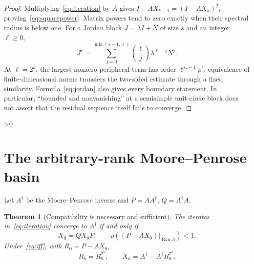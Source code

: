 \documentclass[9pt]{extarticle}
\newtheorem{theorem}{Theorem}
\newcommand{\ran}{\operatorname{Ran}}
\begin{document}
\begin{proof}
Multiplying~\eqref{eq:iteration} by $A$ gives
$I-AX_{k+1}=(I-AX_k)^2$, proving~\eqref{eq:squarepower}.  Matrix powers
tend to zero exactly when their spectral radius is below one.
For a Jordan block $J=\lambda I+N$ of size $s$ and an integer $\ell\geq0$,
\begin{equation}\label{eq:jordan}
 J^\ell=\sum_{j=0}^{\min(s-1,\ell)}
 \binom{\ell}{j}\lambda^{\ell-j}N^j.
\end{equation}
At $\ell=2^k$, the largest nonzero peripheral term has order
$\ell^{s_*-1}\rho^\ell$; equivalence of finite-dimensional norms transfers the
two-sided estimate through a fixed similarity.  Formula~\eqref{eq:jordan}
also gives every boundary statement.  In particular, ``bounded and
nonvanishing'' at a semisimple unit-circle block does not assert that the
residual sequence itself fails to converge.
\end{proof}

\ifnum\CRevisionRound>0
\section{The arbitrary-rank Moore--Penrose basin}
Let $A^\dagger$ be the Moore--Penrose inverse and
$P=AA^\dagger$, $Q=A^\dagger A$.

\begin{theorem}[Compatibility is necessary and sufficient]\label{thm:mp}
The iterates in~\eqref{eq:iteration} converge to $A^\dagger$ if and only if
\begin{equation}\label{eq:iff}
 X_0=QX_0P,\qquad
 \rho\!\left((P-AX_0)|_{\ran A}\right)<1.
\end{equation}
Under~\eqref{eq:iff}, with $R_0=P-AX_0$,
\begin{equation}\label{eq:mppower}
 R_k=R_0^{2^k},\qquad
 X_k=A^\dagger-A^\dagger R_0^{2^k}.
\end{equation}
\end{theorem}
\end{document}
